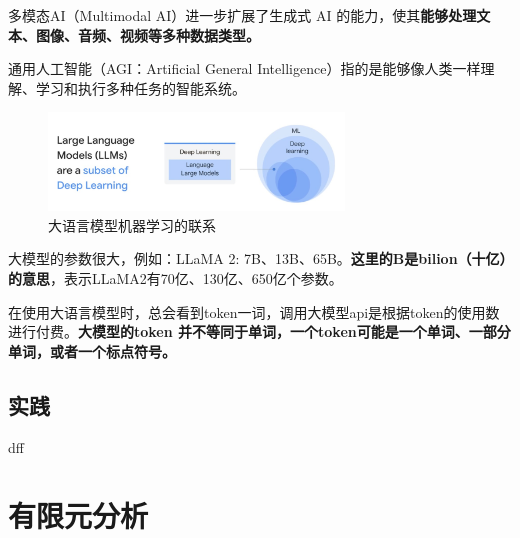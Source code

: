 \documentclass[12pt]{article}
\begin{document}
多模态AI（Multimodal AI）进一步扩展了生成式 AI 的能力，使其\textbf{能够处理文本、图像、音频、视频等多种数据类型。}

通用人工智能（AGI：Artificial General Intelligence）指的是能够像人类一样理解、学习和执行多种任务的智能系统。

\begin{figure}[h]
    \centering
    \includegraphics[width=0.7\textwidth]{./images/llmML.png}
    \caption*{大语言模型机器学习的联系}
\end{figure}
大模型的参数很大，例如：LLaMA 2: 7B、13B、65B。\textbf{这里的B是bilion（十亿）的意思}，表示LLaMA2有70亿、130亿、650亿个参数。

在使用大语言模型时，总会看到token一词，调用大模型api是根据token的使用数进行付费。\textbf{大模型的token 并不等同于单词，一个token可能是一个单词、一部分单词，或者一个标点符号。}

\subsection{实践}


dff
\section{有限元分析}
\end{document}
